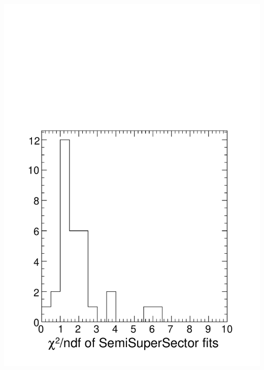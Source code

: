 \documentclass[compress]{beamer}
\begin{document}
\begin{frame}
\begin{columns}
\includegraphics[width=\linewidth]{zfits_chi2.pdf}
\end{columns}
\end{frame}
\end{document}
